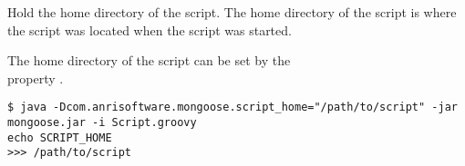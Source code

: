 %

Hold the home directory of the script. 
The home directory of the script is where the script was located when
the script was started.

The home directory of the script can be set by the \\
property .

\begin{lstlisting}[style=Groovybash, label={lst:example_variable_script_home}, title={
Sets the script home directory via Java property.}]
$ java -Dcom.anrisoftware.mongoose.script_home="/path/to/script" -jar mongoose.jar -i Script.groovy
echo SCRIPT_HOME
>>> /path/to/script
\end{lstlisting}

